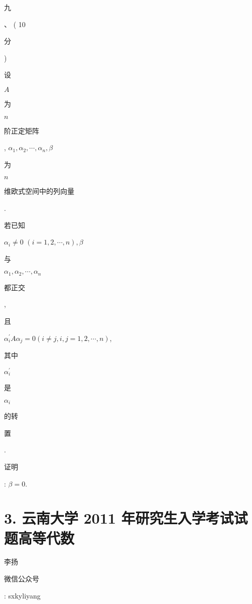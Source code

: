 \documentclass[10pt]{article}
\begin{document}
\begin{CJK}{UTF8}{mj}九\end{CJK}、 ( 10 \begin{CJK}{UTF8}{mj}分\end{CJK}) \begin{CJK}{UTF8}{mj}设\end{CJK} $A$ \begin{CJK}{UTF8}{mj}为\end{CJK} $n$ \begin{CJK}{UTF8}{mj}阶正定矩阵\end{CJK}, $\alpha_{1}, \alpha_{2}, \cdots, \alpha_{n}, \beta$ \begin{CJK}{UTF8}{mj}为\end{CJK} $n$ \begin{CJK}{UTF8}{mj}维欧式空间中的列向量\end{CJK}. \begin{CJK}{UTF8}{mj}若已知\end{CJK} $\alpha_{i} \neq 0$ $(i=1,2, \cdots, n), \beta$ \begin{CJK}{UTF8}{mj}与\end{CJK} $\alpha_{1}, \alpha_{2}, \cdots, \alpha_{n}$ \begin{CJK}{UTF8}{mj}都正交\end{CJK}, \begin{CJK}{UTF8}{mj}且\end{CJK} $\alpha_{i}^{\prime} A \alpha_{j}=0(i \neq j, i, j=1,2, \cdots, n)$, \begin{CJK}{UTF8}{mj}其中\end{CJK} $\alpha_{i}^{\prime}$ \begin{CJK}{UTF8}{mj}是\end{CJK} $\alpha_{i}$ \begin{CJK}{UTF8}{mj}的转\end{CJK} \begin{CJK}{UTF8}{mj}置\end{CJK}. \begin{CJK}{UTF8}{mj}证明\end{CJK}: $\beta=0$.

\section{3. 云南大学 2011 年研究生入学考试试题高等代数}
\begin{CJK}{UTF8}{mj}李扬\end{CJK}

\begin{CJK}{UTF8}{mj}微信公众号\end{CJK}: sxkyliyang
\end{document}
